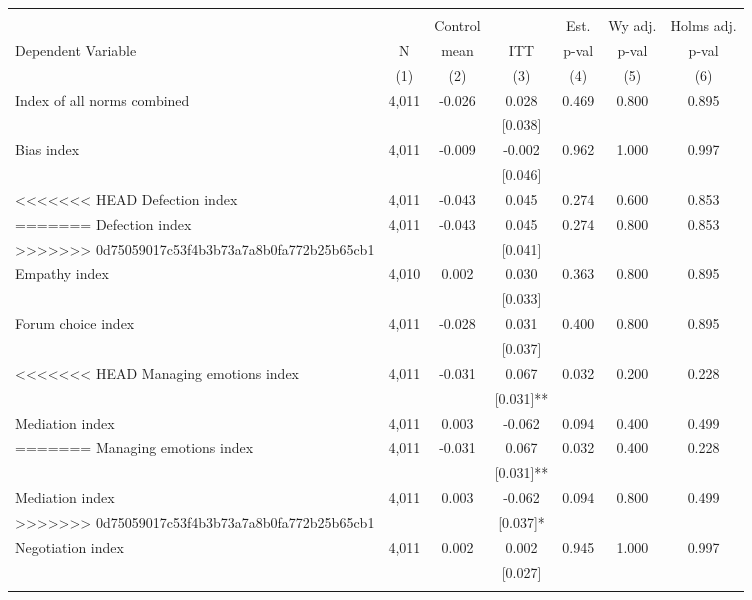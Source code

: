 \begin{tabular}{lcccccc}
\hline \noalign{\smallskip} &  &  &  &  &  & \\
 &  & Control &  & Est. & Wy adj. & Holms adj.\\
Dependent Variable & N & mean & ITT & p-val & p-val & p-val\\
 & (1) & (2) & (3) & (4) & (5) & (6)\\
\noalign{\smallskip}\hline \noalign{\smallskip}Index of all norms combined & 4,011 & -0.026 & 0.028 & 0.469 & 0.800 & 0.895\\
 &  &  & [0.038] &  &  & \\
\quad Bias index & 4,011 & -0.009 & -0.002 & 0.962 & 1.000 & 0.997\\
 &  &  & [0.046] &  &  & \\
<<<<<<< HEAD
\quad Defection index & 4,011 & -0.043 & 0.045 & 0.274 & 0.600 & 0.853\\
=======
\quad Defection index & 4,011 & -0.043 & 0.045 & 0.274 & 0.800 & 0.853\\
>>>>>>> 0d75059017c53f4b3b73a7a8b0fa772b25b65cb1
 &  &  & [0.041] &  &  & \\
\quad Empathy index & 4,010 & 0.002 & 0.030 & 0.363 & 0.800 & 0.895\\
 &  &  & [0.033] &  &  & \\
\quad Forum choice index & 4,011 & -0.028 & 0.031 & 0.400 & 0.800 & 0.895\\
 &  &  & [0.037] &  &  & \\
<<<<<<< HEAD
\quad Managing emotions index & 4,011 & -0.031 & 0.067 & 0.032 & 0.200 & 0.228\\
 &  &  & [0.031]** &  &  & \\
\quad Mediation index & 4,011 & 0.003 & -0.062 & 0.094 & 0.400 & 0.499\\
=======
\quad Managing emotions index & 4,011 & -0.031 & 0.067 & 0.032 & 0.400 & 0.228\\
 &  &  & [0.031]** &  &  & \\
\quad Mediation index & 4,011 & 0.003 & -0.062 & 0.094 & 0.800 & 0.499\\
>>>>>>> 0d75059017c53f4b3b73a7a8b0fa772b25b65cb1
 &  &  & [0.037]* &  &  & \\
\quad Negotiation index & 4,011 & 0.002 & 0.002 & 0.945 & 1.000 & 0.997\\
 &  &  & [0.027] &  &  & \\
\noalign{\smallskip}\hline\end{tabular}
